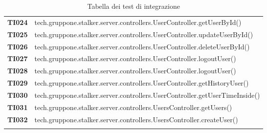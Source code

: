 \documentclass[../../piano-di-qualifica.tex]{subfiles}
\begin{document}
\begin{longtable}[H]{>{\centering\bfseries}m{3cm} >{}m{13cm}}
  TI024               & tech.gruppone.stalker.server.controllers.UserController.getUserById\@()                                   \\

  TI025               & tech.gruppone.stalker.server.controllers.UserController.updateUserById\@()                                \\

  TI026               & tech.gruppone.stalker.server.controllers.UserController.deleteUserById\@()                                \\

  TI027               & tech.gruppone.stalker.server.controllers.UserController.logoutUser\@()                                    \\

  TI028               & tech.gruppone.stalker.server.controllers.UserController.logoutUser\@()                                    \\

  TI029               & tech.gruppone.stalker.server.controllers.UserController.getHistoryUser\@()                                \\

  TI030               & tech.gruppone.stalker.server.controllers.UserController.getUserTimeInside\@()                             \\

  TI031               & tech.gruppone.stalker.server.controllers.UsersController.getUsers\@()                                     \\

  TI032               & tech.gruppone.stalker.server.controllers.UsersController.createUser\@()                                   \\

  \rowcolor{white}
  \caption{Tabella dei test di integrazione}%
  \label{tab:tracciamento_test_integrazione}
\end{longtable}
\end{document}
